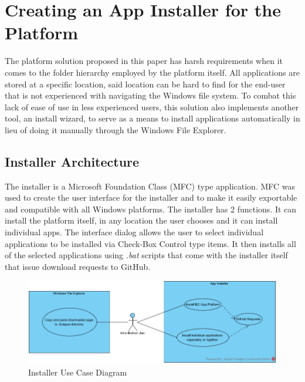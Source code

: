 
\chapter{Creating an App Installer for the Platform}\label{cap:installer}
The platform solution proposed in this paper has harsh requirements when it comes to the folder hierarchy employed by the platform itself. All applications are stored at a specific location, said location can be hard to find for the end-user that is not experienced with navigating the Windows file system. To combat this lack of ease of use in less experienced users, this solution also implements another tool, an install wizard, to serve as a means to install applications automatically in lieu of doing it manually through the Windows File Explorer.


\section{Installer Architecture} \label{sect: Installer architecture}
The installer is a Microsoft Foundation Class (MFC) type application. MFC was used to create the user interface for the installer and to make it easily exportable and compatible with all Windows platforms. The installer has 2 functions. It can install the platform itself, in any location the user chooses and it can install individual apps. The interface dialog allows the user to select individual applications to be installed via Check-Box Control type items. It then installs all of the selected applications using \textit{.bat} scripts that come with the installer itself that issue download requests to GitHub.

\begin{figure}[H]
  \centering
  \includegraphics[width=1\textwidth]{Diagrams/Use Case/Installer.jpg}
  \caption{Installer Use Case Diagram}
\end{figure}


